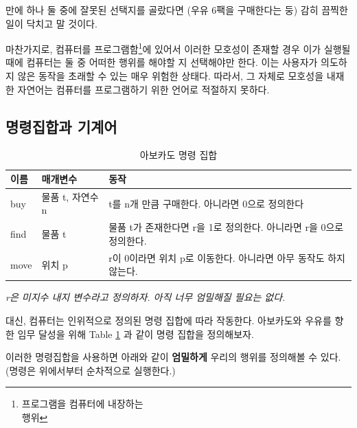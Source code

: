 \documentclass{article}
\begin{document}
만에 하나 둘 중에 잘못된 선택지를 골랐다면 (우유 6팩을 구매한다는 둥)
감히 끔찍한 일이 닥치고 말 것이다.

마찬가지로, 컴퓨터를 프로그램함\footnote{프로그램을 컴퓨터에 내장하는 \\
행위}에 있어서 이러한 모호성이 존재할 경우 이가 실행될 때에 컴퓨터는 둘
중 어떠한 행위를 해야할 지 선택해야만 한다. 이는 사용자가 의도하지 않은
동작을 초래할 수 있는 매우 위험한 상태다. 따라서, 그 자체로 모호성을
내재한 자연어는 컴퓨터를 프로그램하기 위한 언어로 적절하지 못하다.

\subsection{명령집합과 기계어}

\begin{table}[!h]
    \centering

    \caption{아보카도 명령 집합}
    \label{Tab:avocado-isa}

    \begin{tabular}{ || m{2em} | m{3.8em} | m{22em} || }
        \hline
        이름 & 매개변수 & 동작 \\
        \hline\hline
        buy & 물품 t, 자연수 n & t를 n개 만큼 구매한다. 아니라면 0으로 정의한다 \\
        \hline
        find & 물품 t & 물품 t가 존재한다면 r을 1로 정의한다. 아니라면 r을 0으로 정의한다. \\
        \hline
        move & 위치 p & r이 0이라면 위치 p로 이동한다. 아니라면 아무 동작도 하지 않는다. \\
        \hline
    \end{tabular}
    \newline
    \textit{\color{gray} \small r은 미지수 내지 변수라고 정의하자.
    아직 너무 엄밀해질 필요는 없다.}
\end{table}

대신, 컴퓨터는 인위적으로 정의된 명령 집합에 따라 작동한다. 아보카도와
우유를 향한 임무 달성을 위해 Table \ref{Tab:avocado-isa} 과 같이 명령
집합을 정의해보자.

이러한 명령집합을 사용하면 아래와 같이 \textbf{엄밀하게} 우리의 행위를
정의해볼 수 있다. (명령은 위에서부터 순차적으로 실행한다.)
\end{document}

